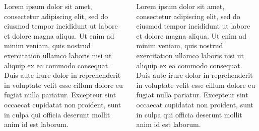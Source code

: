 \documentclass[22pt,margin=0.5in,innermargin=-4.5in,blockverticalspace=-0.5in]{tikzposter}
\begin{document}
\begin{columns}
{{\begin{minipage}[c]{\linewidth-15cm}
Lorem ipsum dolor sit amet, consectetur adipiscing elit, sed do eiusmod tempor incididunt ut labore et dolore magna aliqua. Ut enim ad minim veniam, quis nostrud exercitation ullamco laboris nisi ut aliquip ex ea commodo consequat. Duis aute irure dolor in reprehenderit in voluptate velit esse cillum dolore eu fugiat nulla pariatur. Excepteur sint occaecat cupidatat non proident, sunt in culpa qui officia deserunt mollit anim id est laborum.

\end{minipage}%

}
\vspace{1cm}

Lorem ipsum dolor sit amet, consectetur adipiscing elit, sed do eiusmod tempor incididunt ut labore et dolore magna aliqua. Ut enim ad minim veniam, quis nostrud exercitation ullamco laboris nisi ut aliquip ex ea commodo consequat. Duis aute irure dolor in reprehenderit in voluptate velit esse cillum dolore eu fugiat nulla pariatur. Excepteur sint occaecat cupidatat non proident, sunt in culpa qui officia deserunt mollit anim id est laborum.


}
\end{columns}
\end{document}
